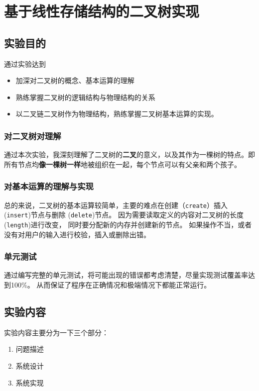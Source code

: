 \chapter{基于线性存储结构的二叉树实现}\label{chapter:3}

\section{实验目的}\label{sec:test31}
通过实验达到
\begin{itemize}
    \item 加深对二叉树的概念、基本运算的理解
    \item 熟练掌握二叉树的逻辑结构与物理结构的关系
    \item 以二叉链二叉树作为物理结构，熟练掌握二叉树基本运算的实现。
\end{itemize}

\subsection{对二叉树对理解}
通过本次实验，我深刻理解了二叉树的\textbf{二叉}的意义，以及其作为一棵树的特点。即所有节点均\textbf{像一棵树一样}地被组织在一起，每个节点可以有父亲和两个孩子。
\newline
\subsection{对基本运算的理解与实现}
总的来说，二叉树的基本运算较简单，主要的难点在创建（\texttt{create}）插入 (\texttt{insert})节点与删除 (\texttt{delete})节点。
因为需要读取定义的内容对二叉树的长度 (\texttt{length})进行改变，
同时要分配新的内存并创建新的节点。
如果操作不当，或者没有对用户的输入进行校验，插入或删除出错。
\subsection{单元测试}
通过编写完整的单元测试，将可能出现的错误都考虑清楚，尽量实现测试覆盖率达到100\%。
从而保证了程序在正确情况和极端情况下都能正常运行。


\section{实验内容}\label{sec:test32}
    实验内容主要分为一下三个部分：
\begin{enumerate}
    \item 问题描述
    \item 系统设计
    \item 系统实现
\end{enumerate}
